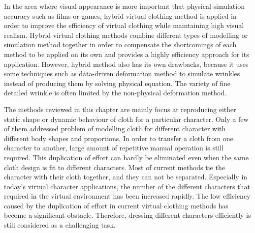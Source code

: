 In the area where visual appearance is more important that physical simulation accuracy such as films or games, hybrid virtual clothing method is applied in order to improve the efficiency of virtual clothing while maintaining high visual realism. Hybrid virtual clothing methods combine different types of modelling or simulation method together in order to compensate the shortcomings of each method to be applied on its own and provides a highly efficiency approach for its application. However, hybrid method also has its own drawbacks, because it uses some techniques such as data-driven deformation method to simulate wrinkles instead of producing them by solving physical equation. The variety of fine detailed wrinkle is often limited by the non-physical deformation method.

The methods reviewed in this chapter are mainly focus at reproducing either static shape or dynamic behaviour of cloth for a particular character. Only a few of them addressed problem of modelling cloth for different character with different body shapes and proportions. In order to transfer a cloth from one character to another, large amount of repetitive manual operation is still required. This duplication of effort can hardly be eliminated even when the same cloth design is fit to different characters. Most of current methods tie the character with their cloth together, and they can not be separated. Especially in today's virtual character applications, the number of the different characters that required in the virtual environment has been increased rapidly. The low efficiency caused by the duplication of effort in current virtual clothing methods has become a significant obstacle. Therefore, dressing different characters efficiently is still considered as a challenging task. 


